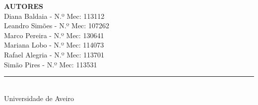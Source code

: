 \begin{titlepage}
\begin{minipage}[t][0.94\textheight][t]{0.92\textwidth}
  \vspace{1.8cm}

  {\small\bfseries\color{uagreen} AUTORES}\\[0.35cm]
  {\normalsize\color{uadark}
    Diana Baldaia - N.º Mec: 113112\\[0.15cm]
    Leandro Simões - N.º Mec: 107262\\[0.15cm]
    Marco Pereira - N.º Mec: 130641\\[0.15cm]
    Mariana Lobo - N.º Mec: 114073\\[0.15cm]
    Rafael Alegria - N.º Mec: 113701\\[0.15cm]
    Simão Pires - N.º Mec: 113531
  }

  \vfill

  \noindent\textcolor{uaborder}{\rule{\textwidth}{0.5pt}}\\[0.3cm]
  {\small\color{uamuted} Universidade de Aveiro \hfill \anoLetivo}

\end{minipage}
\end{titlepage}
